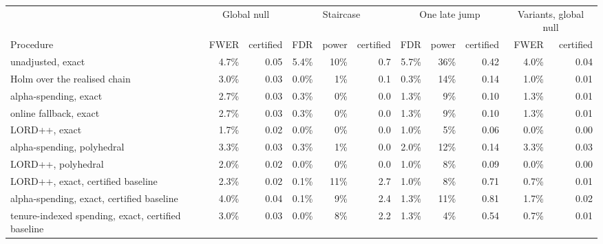 \begin{tabular}{lrrrrrrrrrr}
\toprule
 & \multicolumn{2}{c}{Global null} & \multicolumn{3}{c}{Staircase} & \multicolumn{3}{c}{One late jump} & \multicolumn{2}{c}{Variants, global null} \\
Procedure & FWER & certified & FDR & power & certified & FDR & power & certified & FWER & certified \\
\midrule
unadjusted, exact & 4.7\% & 0.05 & 5.4\% & 10\% & 0.7 & 5.7\% & 36\% & 0.42 & 4.0\% & 0.04 \\
Holm over the realised chain & 3.0\% & 0.03 & 0.0\% & 1\% & 0.1 & 0.3\% & 14\% & 0.14 & 1.0\% & 0.01 \\
alpha-spending, exact & 2.7\% & 0.03 & 0.3\% & 0\% & 0.0 & 1.3\% & 9\% & 0.10 & 1.3\% & 0.01 \\
online fallback, exact & 2.7\% & 0.03 & 0.3\% & 0\% & 0.0 & 1.3\% & 9\% & 0.10 & 1.3\% & 0.01 \\
LORD++, exact & 1.7\% & 0.02 & 0.0\% & 0\% & 0.0 & 1.0\% & 5\% & 0.06 & 0.0\% & 0.00 \\
alpha-spending, polyhedral & 3.3\% & 0.03 & 0.3\% & 1\% & 0.0 & 2.0\% & 12\% & 0.14 & 3.3\% & 0.03 \\
LORD++, polyhedral & 2.0\% & 0.02 & 0.0\% & 0\% & 0.0 & 1.0\% & 8\% & 0.09 & 0.0\% & 0.00 \\
LORD++, exact, certified baseline & 2.3\% & 0.02 & 0.1\% & 11\% & 2.7 & 1.0\% & 8\% & 0.71 & 0.7\% & 0.01 \\
alpha-spending, exact, certified baseline & 4.0\% & 0.04 & 0.1\% & 9\% & 2.4 & 1.3\% & 11\% & 0.81 & 1.7\% & 0.02 \\
tenure-indexed spending, exact, certified baseline & 3.0\% & 0.03 & 0.0\% & 8\% & 2.2 & 1.3\% & 4\% & 0.54 & 0.7\% & 0.01 \\
\bottomrule
\end{tabular}
